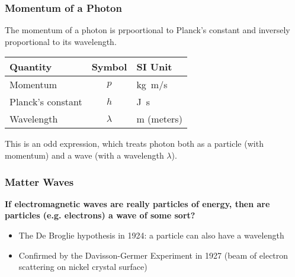 \documentclass[12pt,compress,aspectratio=169]{beamer}
\newcommand{\pic}[2]{\texttt{[image: \#2]}}
\newcommand{\eq}[2]{\vspace{#1}{\Large\begin{displaymath}#2\end{displaymath}}}
\begin{document}
\begin{frame}
  \frametitle{Momentum of a Photon}
  The momentum of a photon is prpoortional to Planck's constant and 
  inversely proportional to its wavelength.

  \eq{-.2in}{
    \boxed{p=\frac{h}{\lambda}}
  }

  \begin{center}
    \begin{tabular}{l|c|l}
      \rowcolor{pink}
      \textbf{Quantity} & \textbf{Symbol} & \textbf{SI Unit} \\ \hline
      Momentum          & $p$ & \si{\kilo\gram.\metre/\second}\\
      Planck's constant & $h$ & \si{\joule.\second}\\
      Wavelength        & $\lambda$ & \si{\metre} (meters) \\
    \end{tabular}
  \end{center}

  This is an odd expression, which treats photon both as a particle (with
  momentum) and a wave (with a wavelength $\lambda$).
\end{frame}




\begin{frame}
  \frametitle{Matter Waves}
  \textbf{If electromagnetic waves are really particles of energy, then are
    particles (e.g. electrons) a wave of some sort?}
  \begin{itemize}
  \item The De Broglie hypothesis in 1924: a particle can also have a
    wavelength
  \item Confirmed by the Davisson-Germer Experiment in 1927 (beam of electron
    scattering on nickel crystal surface)
  \end{itemize}
\end{frame}
\end{document}
